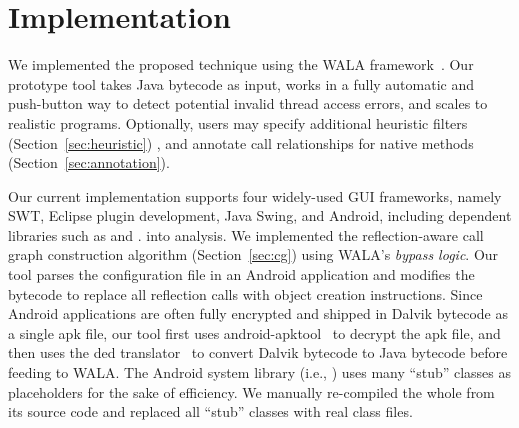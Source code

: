 \section{Implementation}
\label{sec:implementation}

We implemented the proposed technique using the WALA framework~\cite{walatutorial}.
Our prototype tool takes Java bytecode as input, works in a fully
automatic and push-button way to detect potential invalid thread access
errors, and scales to realistic programs.  
Optionally, users may specify additional heuristic filters (Section~\ref{sec:heuristic}) %
, and annotate call relationships for native methods (Section~\ref{sec:annotation}).

Our current implementation supports four widely-used GUI frameworks, namely
SWT, Eclipse plugin development, Java Swing, and Android, including
dependent libraries such as  and .
into analysis. We implemented the reflection-aware call graph construction
 algorithm (Section~\ref{sec:cg})
using WALA's \textit{bypass logic}. Our tool parses the configuration file
in an Android application and modifies the bytecode to replace all
reflection calls with object creation instructions.
Since Android applications are often fully encrypted and shipped in Dalvik
bytecode as a single apk file, our tool first uses
android-apktool~\cite{apktool} to
decrypt the apk file, and then uses the 
ded translator~\cite{Enck:2011:SAA:2028067.2028088} to convert
Dalvik bytecode to Java bytecode before feeding to WALA.  The Android system
library (i.e., ) uses many ``stub'' classes as
placeholders for the sake of efficiency. We manually re-compiled the whole
 from its source code and replaced all ``stub'' classes
with real class files.


